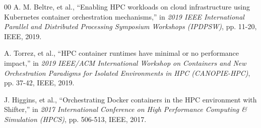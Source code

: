 \documentclass[conference]{IEEEtran}
\begin{document}
\begin{thebibliography}{00}
 A. M. Beltre, et al., ``Enabling HPC workloads on cloud infrastructure using Kubernetes container orchestration mechanisms,'' in \textit{2019 IEEE International Parallel and Distributed Processing Symposium Workshops (IPDPSW)}, pp. 11-20, IEEE, 2019.

 A. Torrez, et al., ``HPC container runtimes have minimal or no performance impact,'' in \textit{2019 IEEE/ACM International Workshop on Containers and New Orchestration Paradigms for Isolated Environments in HPC (CANOPIE-HPC)}, pp. 37-42, IEEE, 2019.

 J. Higgins, et al., ``Orchestrating Docker containers in the HPC environment with Shifter,'' in \textit{2017 International Conference on High Performance Computing \& Simulation (HPCS)}, pp. 506-513, IEEE, 2017.
\end{thebibliography}
\end{document}

